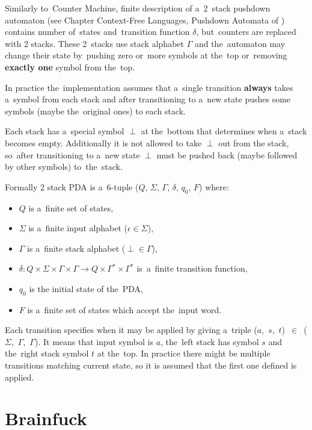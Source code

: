 \documentclass[english,shortabstract,mgr]{iithesis}
\begin{document}
Similarly to~Counter Machine, finite description of a~2~stack pushdown automaton (see Chapter Context-Free Languages, Pushdown Automata of \cite{sipser2012ChurchTuring})
contains number of~states and~transition function $\delta$, but~counters are replaced with 2 stacks.
These 2~stacks use stack alphabet $\Gamma$ and the~automaton may change their state
by~pushing zero or~more symbols at the~top or~removing \textbf{exactly one} symbol from
the~top.

In practice the~implementation assumes that a~single transition \textbf{always} takes
a~symbol from each stack and after transitioning to a~new state pushes some symbols
(maybe the~original ones) to each stack.

Each stack has a~special symbol $\perp$ at the~bottom that determines when a~stack becomes
empty. Additionally it is not allowed to take $\perp$ out from the stack, so~after transitioning
to a~new state $\perp$ must be pushed back (maybe followed by other symbols) to~the~stack.

Formally 2 stack PDA is a~$6$-tuple ($Q$, $\Sigma$, $\Gamma$, $\delta$, $q_0$, $F$) where:
\begin{itemize}
  \item $Q$ is a~finite set of states,
  \item $\Sigma$ is a~finite input alphabet ($\epsilon \in \Sigma$),
  \item $\Gamma$ is a~finite stack alphabet ($\perp \in \Gamma$),
  \item $\delta: Q \times \Sigma \times \Gamma \times \Gamma \rightarrow
      Q \times \Gamma^* \times \Gamma^*$ is~a~finite transition function,
  \item $q_0$ is the initial state of the~PDA,
  \item $F$ is a~finite set of states which accept the~input word.
\end{itemize}

Each transition specifies when it may be applied by giving a~triple
($a$,~$s$,~$t$)~$\in$~($\Sigma$,~$\Gamma$,~$\Gamma$). It means that input symbol is $a$,
the~left stack has symbol $s$ and the~right stack symbol $t$ at the~top. In practice there
might be multiple transitions matching current state, so it is assumed that the first one
defined is applied.

\section{Brainfuck}
\end{document}

